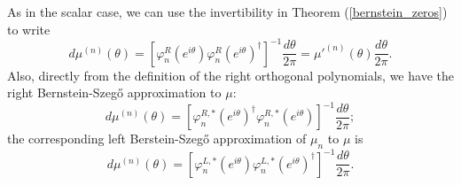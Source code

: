 \documentclass[11pt]{article}
\begin{document}
As in the scalar case, we can use the invertibility in Theorem (\ref{bernstein_zeros}) to write 
\begin{equation} \label{eq:BS_measure}
d\mu^{(n)}(\theta) = [\varphi_{n}^{R}(e^{i\theta})\varphi_{n}^{R}(e^{i\theta})^{\dag}]^{-1}\frac{d\theta}{2\pi} = \mu'^{(n)}(\theta)\frac{d\theta}{2\pi}.
\end{equation} 
Also, directly from the definition of the right orthogonal polynomials, we have the right Bernstein-Szeg\H{o} approximation to $\mu$:
\[
d\mu^{(n)}(\theta) = [\varphi_{n}^{R,*}(e^{i\theta})^{\dag}\varphi_{n}^{R,*}(e^{i\theta})]^{-1}\frac{d\theta}{2\pi};
\]
\noindent the corresponding left Berstein-Szeg\H{o} approximation of ${\mu}_n     $ to $\mu$ is 
\[
d\mu^{(n)}(\theta) = [\varphi_{n}^{L,*}(e^{i\theta})\varphi_{n}^{L,*}(e^{i\theta})^{\dag}]^{-1}\frac{d\theta}{2\pi}.
\]
\end{document}
